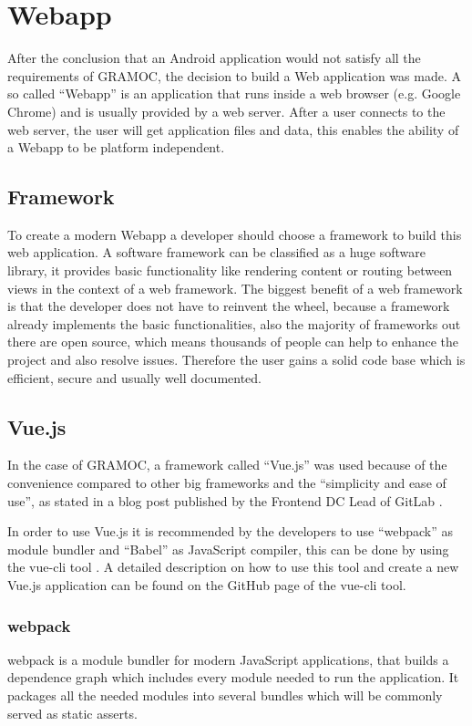 \chapter{Webapp}
\label{ch:Webapp}

\author{Nico Leidenfrost}
%
After the conclusion that an Android application would not satisfy all the requirements of GRAMOC, the decision to build a Web application was made. A so called ``Webapp'' is an application that runs inside a web browser (e.g. Google Chrome) and is usually provided by a web server. After a user connects to the web server, the user will get application files and data, this enables the ability of a Webapp to be platform independent.

\section{Framework}
To create a modern Webapp a developer should choose a framework to build this web application. A software framework can be classified as a huge software library, it provides basic functionality like rendering content or routing between views in the context of a web framework. The biggest benefit of a web framework is that the developer does not have to reinvent the wheel, because a framework already implements the basic functionalities, also the majority of frameworks out there are open source, which means thousands of people can help to enhance the project and also resolve issues. Therefore the user gains a solid code base which is efficient, secure and usually well documented.

\section{Vue.js}
In the case of GRAMOC, a framework called ``Vue.js'' was used because of the convenience compared to other big frameworks and the ``simplicity and ease of use'', as stated in a blog post published by the Frontend DC Lead of GitLab \cite{Vue, WhyVue, GitLab}.

In order to use Vue.js it is recommended by the developers to use ``webpack''  as module bundler and ``Babel'' as JavaScript compiler, this can be done by using the vue-cli tool \cite{webpack, Babel, vuecli}. A detailed description on how to use this tool and create a new Vue.js application can be found on the GitHub page of the vue-cli tool.

\subsection{webpack}
webpack is a module bundler for modern JavaScript applications, that builds a dependence graph which includes every module needed to run the application. It packages all the needed modules into several bundles which will be commonly served as static asserts.

